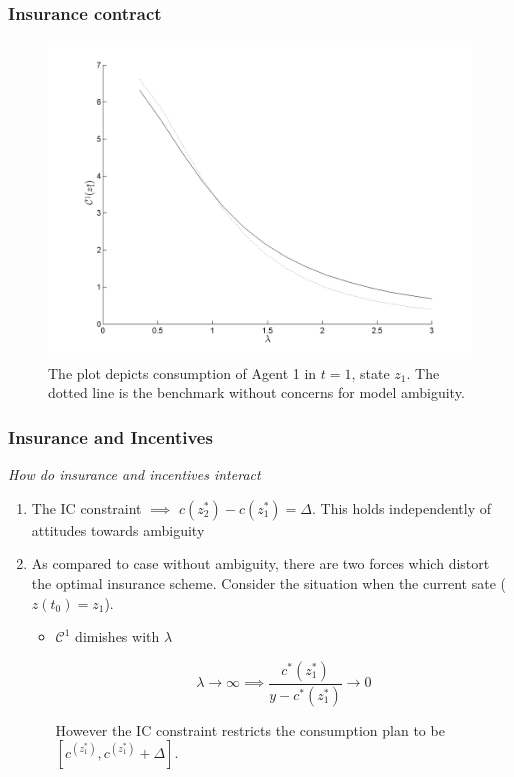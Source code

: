 \documentclass{beamer}
\theoremstyle{definition}
\begin{document}
\begin{frame}
\frametitle{Insurance contract}
\begin{figure}[htbp]
\centering
	  \includegraphics[scale=0.5]{Matlab/PrivateInformation/Plots/StaticPIConsumptionPlan.png}

	\caption{The plot depicts consumption of Agent 1 in $t=1$, state $z_1$. The dotted line is the benchmark without concerns for model ambiguity.}
	\label{fig:BondEconomyOucomes}
\end{figure} 

\end{frame}
\begin{frame}
\frametitle{Insurance and Incentives} 
\emph{How do insurance and incentives interact}
\begin{enumerate}
	\item The IC constraint $\implies $  $c(z^*_2)-c(z^*_1)=\Delta$. This holds independently of attitudes towards ambiguity
	
	\item As compared to case without ambiguity, there are two forces which distort the optimal insurance scheme. Consider the situation when the current sate ($z(t_0)=z_1$). 
	
\begin{itemize}
	\item $\mathcal{C}^1$ dimishes with $\lambda$
	
	\[\lambda \to \infty \implies \frac{c^*(z^*_1)}{y-c^*(z^*_1)} \to 0\]
	
	However the IC constraint restricts the consumption plan to be $[c^(z^*_1),c^(z^*_1)+\Delta]$. 
	\end{itemize}
\end{enumerate}
	\end{frame}
	
\end{document}
